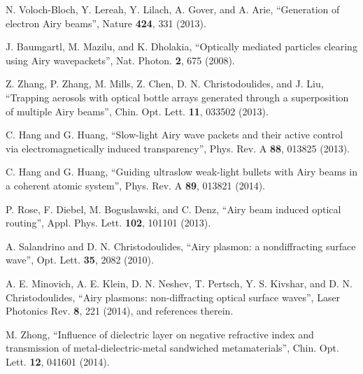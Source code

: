 \documentclass[aps,pra,preprint,groupedaddress,amsmath,amssymb,showpacs]{revtex4-1}
\begin{document}
\begin{references}

 N. Voloch-Bloch, Y. Lereah, Y. Lilach, A. Gover, and A. Arie,
``Generation of electron Airy beams'',
Nature {\bf 424}, 331 (2013).

\vskip 0.7cm


 J. Baumgartl, M. Mazilu, and K. Dholakia,
``Optically mediated particles clearing using Airy wavepackets'',
Nat. Photon. {\bf 2}, 675 (2008).

\vskip 0.7cm

 Z. Zhang, P. Zhang, M. Mills, Z. Chen, D. N. Christodoulides, and J. Liu,
``Trapping aerosols with optical bottle arrays generated through a superposition of multiple Airy beams'',
Chin. Opt. Lett. {\bf 11}, 033502 (2013).

\vskip 0.7cm


 C. Hang and G. Huang,
``Slow-light Airy wave packets and their active control via electromagnetically induced transparency'',
Phys. Rev. A {\bf 88}, 013825 (2013).

\vskip 0.7cm

 C. Hang and G. Huang,
``Guiding ultraslow weak-light bullets with Airy beams in a coherent atomic system'',
Phys. Rev. A {\bf 89}, 013821 (2014).

\vskip 0.7cm


 P. Rose, F. Diebel, M. Boguslawski, and C. Denz,
``Airy beam induced optical routing'',
Appl. Phys. Lett. {\bf 102}, 101101 (2013).

\vskip 0.7cm


 A. Salandrino and D. N. Christodoulides,
``Airy plasmon: a nondiffracting surface wave'',
Opt. Lett. {\bf 35}, 2082 (2010).

\vskip 0.7cm

 A. E. Minovich, A. E. Klein, D. N. Neshev, T. Pertsch, Y. S. Kivshar, and D. N. Christodoulides,
``Airy plasmons: non-diffracting optical surface waves'',
Laser Photonics Rev. {\bf 8}, 221 (2014), and references therein.

\vskip 0.7cm

 M. Zhong,
``Influence of dielectric layer on negative refractive index and transmission of metal-dielectric-metal sandwiched metamaterials'',
Chin. Opt. Lett. {\bf 12}, 041601 (2014).


\end{references}
\end{document}
